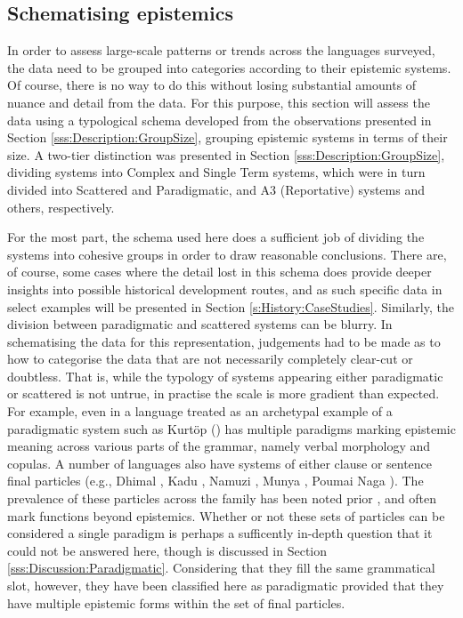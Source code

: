 \subsection{Schematising epistemics}\label{ss:History:Schema}
In order to assess large-scale patterns or trends across the languages surveyed, the data need to be grouped into categories according to their epistemic systems. Of course, there is no way to do this without losing substantial amounts of nuance and detail from the data. For this purpose, this section will assess the data using a typological schema developed from the observations presented in Section \ref{sss:Description:GroupSize}, grouping epistemic systems in terms of their size. A two-tier distinction was presented in Section \ref{sss:Description:GroupSize}, dividing systems into Complex and Single Term systems, which were in turn divided into Scattered and Paradigmatic, and A3 (Reportative) systems and others, respectively.

For the most part, the schema used here does a sufficient job of dividing the systems into cohesive groups in order to draw reasonable conclusions. There are, of course, some cases where the detail lost in this schema does provide deeper insights into possible historical development routes, and as such specific data in select examples will be presented in Section \ref{s:History:CaseStudies}. Similarly, the division between paradigmatic and scattered systems can be blurry. In schematising the data for this representation, judgements had to be made as to how to categorise the data that are not necessarily completely clear-cut or doubtless. That is, while the typology of systems appearing either paradigmatic or scattered is not untrue, in practise the scale is more gradient than expected. For example, even in a language treated as an archetypal example of a paradigmatic system such as Kurtöp (\cite[East Bodish: Bhutan, ][]{Hyslop2020Kurtop}) has multiple paradigms marking epistemic meaning across various parts of the grammar, namely verbal morphology and copulas. A number of languages also have systems of either clause or sentence final particles (e.g., Dhimal \cite{King2009}, Kadu \cite{Sangdong2012}, Namuzi \cite{Pavlik2017}, Munya \cite{Bai2019}, Poumai Naga \cite{Veikho2021}). The prevalence of these particles across the family has been noted prior \cite{DeLancey2011}, and often mark functions beyond epistemics. Whether or not these sets of particles can be considered a single paradigm is perhaps a sufficently in-depth question that it could not be answered here, though is discussed in Section \ref{sss:Discussion:Paradigmatic}. Considering that they fill the same grammatical slot, however, they have been classified here as paradigmatic provided that they have multiple epistemic forms within the set of final particles.

